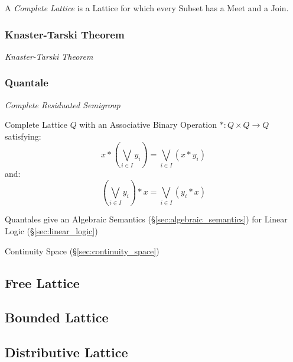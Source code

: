 A \emph{Complete Lattice} is a Lattice for which every Subset has a
Meet and a Join.



\subsubsection{Knaster-Tarski Theorem}\label{sec:knaster_tarski}

\emph{Knaster-Tarski Theorem}



\subsubsection{Quantale}\label{sec:quantale}

\emph{Complete Residuated Semigroup}

Complete Lattice $Q$ with an Associative Binary Operation $* : Q
\times Q \rightarrow Q$ satisfying:
\[
  x*(\bigvee_{i \in I} y_i) = \bigvee_{i \in I}(x * y_i)
\]
and:
\[
  (\bigvee_{i \in I} y_i)*x = \bigvee_{i \in I}(y_i * x)
\]

Quantales give an Algebraic Semantics
(\S\ref{sec:algebraic_semantics}) for Linear Logic
(\S\ref{sec:linear_logic})

Continuity Space (\S\ref{sec:continuity_space})



\subsection{Free Lattice}\label{sec:free_lattice}

\subsection{Bounded Lattice}\label{sec:bounded_lattice}

\subsection{Distributive Lattice}\label{sec:distributive_lattice}

